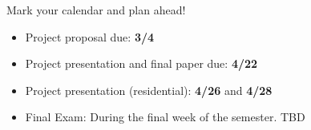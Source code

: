 \documentclass[11pt,article,oneside]{memoir} %
\begin{document}
Mark your calendar and plan ahead!

\vspace{-10pt}
\begin{itemize}\itemsep=0pt%
\item Project proposal due: \textbf{3/4}
\item Project presentation and final paper due: \textbf{4/22}
\item Project presentation (residential): \textbf{4/26} and \textbf{4/28} 
\item Final Exam: During the final week of the semester. TBD
\end{itemize} %





\end{document}

